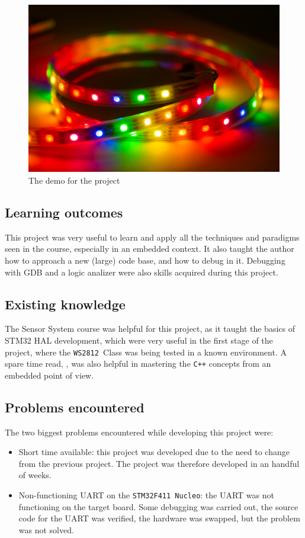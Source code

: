\documentclass[10pt,a4]{article}
\newcommand{\stm}{\texttt{STM32F411 }}
\newcommand{\ws}{\texttt{WS2812 }}
\begin{document}
\begin{figure}
\includegraphics[width=\linewidth]{DSC03046.jpg}
\caption{\label{fig:encoding}The demo for the project}
\end{figure}
\subsection{Learning outcomes}

This project was very useful to learn and apply all the  techniques and paradigms seen in the course, especially in an embedded context. It also taught the author how to approach a new (large) code base, and how to debug in it. Debugging with GDB and a logic analizer were also skills acquired during this project.


\subsection{Existing knowledge}
The Sensor System course was helpful for this project, as it taught the basics of STM32 HAL development, which were very useful in the first stage of the project, where the \ws Class was being tested in a known environment. A spare time read, \cite{kormanyos2021real}, was also helpful in mastering the \texttt{C++} concepts from an embedded point of view.


\subsection{Problems encountered}
The two biggest problems encountered while developing this project were:
\begin{itemize}
\item Short time available: this project was developed due to the need to change from the previous project. The project was therefore developed in an handful of weeks.
\item Non-functioning UART on the \stm \texttt{Nucleo}: the UART was not functioning on the target board. Some debugging was carried out, the source code for the UART was verified, the hardware was swapped, but the problem was not solved. 
\end{itemize}






\end{document}
